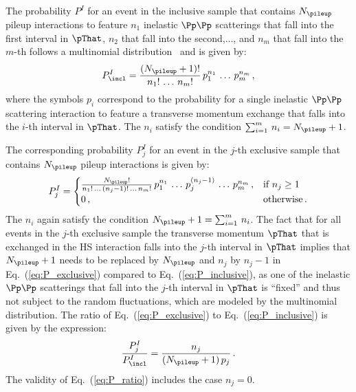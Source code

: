 The probability $P^{I}$ for an event in the inclusive sample that contains $N_{\pileup}$ pileup interactions
to feature $n_{1}$ inelastic $\Pp\Pp$ scatterings that fall into the first interval in $\pThat$, $n_{2}$ that fall into the second,$\dots$, and $n_{m}$ that fall into the $m$-th 
follows a multinomial distribution~\cite{evans2011statistical} and is given by:
\begin{equation}
P_{\incl}^{I} = \frac{(N_{\pileup} + 1)!}{n_{1}! \, \dots \, n_{m}!} \, p_{1}^{n_{1}} \, \dots \, p_{m}^{n_{m}} \, ,
\label{eq:P_inclusive}
\end{equation}
where the symbols $p_{i}$ correspond to the probability for a single inelastic $\Pp\Pp$ scattering interaction to feature a transverse momentum exchange that falls into the $i$-th interval in $\pThat$.
The $n_{i}$ satisfy the condition $\sum_{i=1}^{m} \, n_{i} = N_{\pileup} + 1$.

The corresponding probability $P_{j}^{I}$ for an event in the $j$-th exclusive sample that contains $N_{\pileup}$ pileup interactions is given by:
\begin{equation}
P_{j}^{I} = \begin{cases}
\frac{N_{\pileup}!}{n_{1}! \, \dots \, (n_{j} - 1)! \, \dots \, n_{m}!} \, p_{1}^{n_{1}} \, \dots \, p_{j}^{(n_{j} - 1)} \, \dots \, p_{m}^{n_{m}} \, ,
  & \text{if $n_{j} \geq 1$} \\
0 \, , & \text{otherwise} \, .
\end{cases}
\label{eq:P_exclusive}
\end{equation}
The $n_{i}$ again satisfy the condition $N_{\pileup} + 1 = \sum_{i=1}^{m} \, n_{i}$.
The fact that for all events in the $j$-th exclusive sample the transverse momentum $\pThat$ that is exchanged in the HS interaction falls into the $j$-th interval in $\pThat$
implies that $N_{\pileup} + 1$ needs to be replaced by $N_{\pileup}$ and $n_{j}$ by $n_{j} - 1$ in Eq.~(\ref{eq:P_exclusive}) compared to Eq.~(\ref{eq:P_inclusive}),
as one of the inelastic $\Pp\Pp$ scatterings that fall into the $j$-th interval in $\pThat$ is ``fixed'' and thus not subject to the random fluctuations, which are modeled by the multinomial distribution.
The ratio of Eq.~(\ref{eq:P_exclusive}) to Eq.~(\ref{eq:P_inclusive}) is given by the expression:
\begin{equation}
\frac{P_{j}^{I}}{P_{\incl}^{I}} = \frac{n_{j}}{(N_{\pileup} + 1) \, p_{j}} \, .
\label{eq:P_ratio}
\end{equation}
The validity of Eq.~(\ref{eq:P_ratio}) includes the case $n_{j} = 0$.

